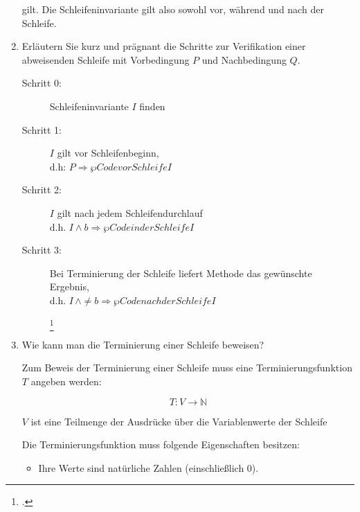 \documentclass{lehramt-informatik-aufgabe}
\begin{document}
\begin{enumerate}
\begin{liAntwort}
\noindent
gilt. Die Schleifeninvariante gilt also sowohl vor, während und nach der
Schleife.
\end{liAntwort}


\item Erläutern Sie kurz und prägnant die Schritte zur Verifikation
einer abweisenden Schleife mit Vorbedingung $P$ und Nachbedingung $Q$.

\begin{liAntwort}
\begin{description}
\item[Schritt 0:] Schleifeninvariante $I$ finden

\item[Schritt 1:] $I$ gilt vor Schleifenbeginn,\\
d.h: $P \Rightarrow \wp{Code vor Schleife}{I}$

\item[Schritt 2:] $I$ gilt nach jedem Schleifendurchlauf\\
d.h. $I \land b \Rightarrow \wp{Code in der Schleife}{I}$

\item[Schritt 3:]

Bei Terminierung der Schleife liefert Methode das gewünschte Ergebnis,\\
d.h. $I \,\land \neq b \Rightarrow \wp{Code nach der Schleife}{I}$

\footcite[Seite 31]{sosy:fs:5}
\end{description}
\end{liAntwort}


\item Wie kann man die Terminierung einer Schleife beweisen?

\begin{liAntwort}
Zum Beweis der Terminierung einer Schleife muss eine
Terminierungsfunktion $T$ angeben werden:

\begin{displaymath}
T \colon V \rightarrow \mathbb{N}
\end{displaymath}

\noindent
$V$ ist eine Teilmenge der Ausdrücke über die Variablenwerte der Schleife

Die Terminierungsfunktion muss folgende Eigenschaften besitzen:

\begin{itemize}
\item Ihre Werte sind natürliche Zahlen (einschließlich 0).


\end{itemize}
\end{liAntwort}
\end{enumerate}
\end{document}
